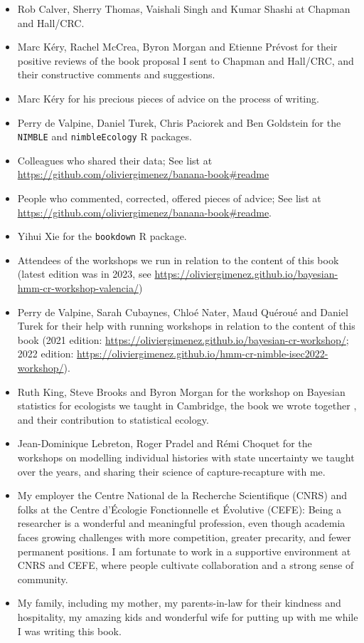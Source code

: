 \documentclass[
  12pt,
]{krantz}
\providecommand{\tightlist}{%
  \setlength{\itemsep}{0pt}\setlength{\parskip}{0pt}}
\begin{document}
\begin{itemize}
\tightlist
\item
  Rob Calver, Sherry Thomas, Vaishali Singh and Kumar Shashi at Chapman and Hall/CRC.\\
\item
  Marc Kéry, Rachel McCrea, Byron Morgan and Etienne Prévost for their positive reviews of the book proposal I sent to Chapman and Hall/CRC, and their constructive comments and suggestions.\\
\item
  Marc Kéry for his precious pieces of advice on the process of writing.\\
\item
  Perry de Valpine, Daniel Turek, Chris Paciorek and Ben Goldstein for the \texttt{NIMBLE} and \texttt{nimbleEcology} R packages.\\
\item
  Colleagues who shared their data; See list at \url{https://github.com/oliviergimenez/banana-book\#readme}
\item
  People who commented, corrected, offered pieces of advice; See list at \url{https://github.com/oliviergimenez/banana-book\#readme}.
\item
  Yihui Xie for the \texttt{bookdown} R package.
\item
  Attendees of the workshops we run in relation to the content of this book (latest edition was in 2023, see \url{https://oliviergimenez.github.io/bayesian-hmm-cr-workshop-valencia/})
\item
  Perry de Valpine, Sarah Cubaynes, Chloé Nater, Maud Quéroué and Daniel Turek for their help with running workshops in relation to the content of this book (2021 edition: \url{https://oliviergimenez.github.io/bayesian-cr-workshop/}; 2022 edition: \url{https://oliviergimenez.github.io/hmm-cr-nimble-isec2022-workshop/}).\\
\item
  Ruth King, Steve Brooks and Byron Morgan for the workshop on Bayesian statistics for ecologists we taught in Cambridge, the book we wrote together \citep{king_bayesian_2009}, and their contribution to statistical ecology.\\
\item
  Jean-Dominique Lebreton, Roger Pradel and Rémi Choquet for the workshops on modelling individual histories with state uncertainty we taught over the years, and sharing their science of capture-recapture with me.
\item
  My employer the Centre National de la Recherche Scientifique (CNRS) and folks at the Centre d'Écologie Fonctionnelle et Évolutive (CEFE): Being a researcher is a wonderful and meaningful profession, even though academia faces growing challenges with more competition, greater precarity, and fewer permanent positions. I am fortunate to work in a supportive environment at CNRS and CEFE, where people cultivate collaboration and a strong sense of community.
\item
  My family, including my mother, my parents-in-law for their kindness and hospitality, my amazing kids and wonderful wife for putting up with me while I was writing this book.
\end{itemize}
\end{document}
